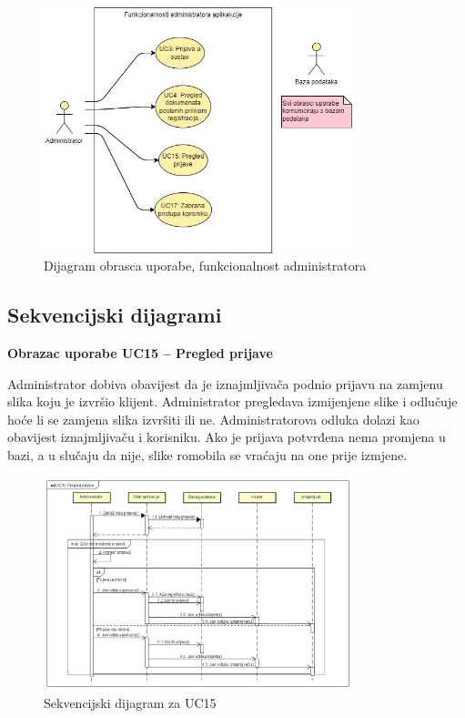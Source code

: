 					\begin{figure}[H]
						\centering
						\includegraphics[width=0.8\textwidth]{dijagrami/AdminUC.png}
						\caption{Dijagram obrasca uporabe, funkcionalnost administratora}
						\label{fig:your_label}
					\end{figure}		
				
			\subsection{Sekvencijski dijagrami}
			
				\noindent \textbf{Obrazac uporabe UC15 – Pregled prijave}
				
				\noindent Administrator dobiva obavijest da je iznajmljivača podnio prijavu na zamjenu slika koju je izvršio klijent. Administrator pregledava izmijenjene slike i odlučuje hoće li se zamjena slika izvršiti ili ne. Administratorova odluka dolazi kao obavijest iznajmljivaču i korisniku. Ako je prijava potvrđena nema promjena u bazi, a u slučaju da nije, slike romobila se vraćaju na one prije izmjene.
				\eject
				
				\begin{figure}[H]
					\centering
					\includegraphics[width=0.8\textwidth]{dijagrami/UC15_Pregled_prijave.png}
					\caption{Sekvencijski dijagram za UC15}
					\label{fig:your_label}
				\end{figure}
				
